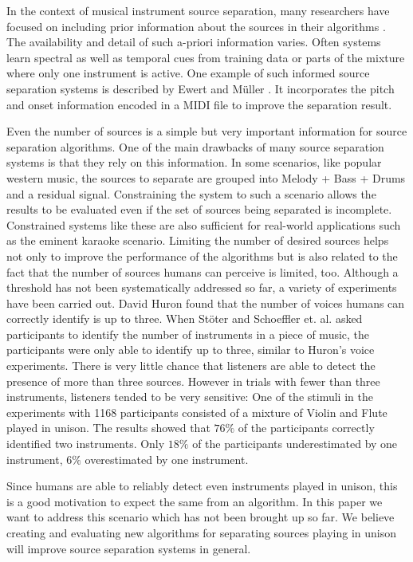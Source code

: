 In the context of musical instrument source separation, many researchers have focused on including prior information about the sources in their algorithms \cite{ozerov12}. The availability and detail of such a-priori information varies. Often systems learn spectral as well as temporal cues from training data or parts of the mixture where only one instrument is active. One example of such informed source separation systems is described by Ewert and M\"uller \cite{ewert12}. It incorporates the pitch and onset information encoded in a MIDI file to improve the separation result.

Even the number of sources is a simple but very important information for source separation algorithms. One of the main drawbacks of many source separation systems is that they rely on this information. In some scenarios, like popular western music, the sources to separate are grouped into Melody + Bass + Drums and a residual signal. Constraining the system to such a scenario allows the results to be evaluated even if the set of sources being separated is incomplete. Constrained systems like these are also sufficient for real-world applications such as the eminent karaoke scenario. Limiting the number of desired sources helps not only to improve the performance of the algorithms but is also related to the fact that the number of sources humans can perceive is limited, too. Although a threshold has not been systematically addressed so far, a variety of experiments have been carried out. David Huron found \cite{huron89} that the number of voices humans can correctly identify is up to three. When St\"oter and Schoeffler et. al. \cite{stoeter13, schoeffler13} asked participants to identify the number of instruments in a piece of music, the participants were only able to identify up to three, similar to Huron's voice experiments. There is very little chance that listeners are able to detect the presence of more than three sources. However in trials with fewer than three instruments, listeners tended to be very sensitive: One of the stimuli in the \cite{stoeter13, schoeffler13} experiments with 1168 participants consisted of a mixture of Violin and Flute played in unison. The results showed that $76\%$ of the participants correctly identified two instruments. Only $18\%$ of the participants underestimated by one instrument, $6\%$ overestimated by one instrument.

Since humans are able to reliably detect even instruments played in unison, this is a good motivation to expect the same from an algorithm. In this paper we want to address this scenario which has not been brought up so far. We believe creating and evaluating new algorithms for separating sources playing in unison will improve source separation systems in general.

